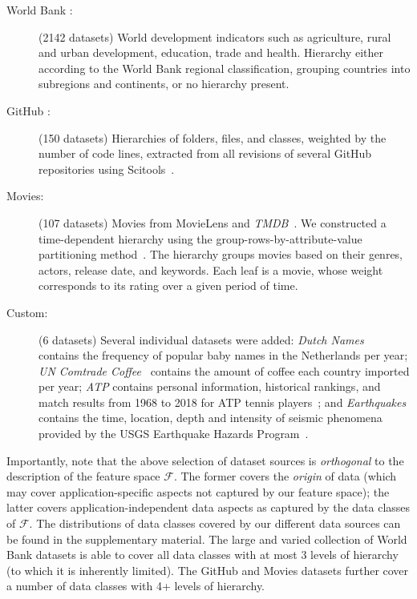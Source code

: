 \begin{description}
\item[World Bank \citep{URLWorldbank}:] (2142 datasets) World development indicators such as agriculture, rural and urban development, education, trade and health. Hierarchy either according to the World Bank regional classification, grouping countries into subregions and continents, or no hierarchy present.
\item[GitHub \citep{URLGit}:] (150 datasets) Hierarchies of folders, files, and classes, weighted by the number of code lines, extracted from all revisions of several GitHub repositories using Scitools~\citep{URLscitools}.
\item[Movies:] (107 datasets) Movies from MovieLens \citep{harper2016movielens} and \emph{TMDB}~\citep{URLmdb}. We constructed a time-dependent hierarchy using the group-rows-by-attribute-value partitioning method~\citep{tablelens,vliegen}. The hierarchy groups movies based on their genres, actors, release date, and keywords. Each leaf is a movie, whose weight corresponds to its rating over a given period of time.
\item[Custom:] (6 datasets) Several individual datasets were added: %
\emph{Dutch Names}~\citep{urlmeertens} contains the frequency of popular baby names in the Netherlands per year; \emph{UN Comtrade Coffee}~\citep{URLComtrade} contains the amount of coffee each country imported per year; \emph{ATP} contains personal information, historical rankings, and match results from 1968 to 2018 for ATP tennis players~\citep{URLatp}; and \emph{Earthquakes} contains the time, location, depth and intensity of seismic phenomena provided by the USGS Earthquake Hazards Program~\citep{URLearth}.
\end{description}
%
Importantly, note that the above selection of dataset sources is \emph{orthogonal} to the description of the feature space $\mathcal{F}$. The former covers the \emph{origin} of data (which may cover application-specific aspects not captured by our feature space); the latter covers application-independent data aspects as captured by the data classes of $\mathcal{F}$. The distributions of data classes covered by our different data sources can be found in the supplementary material. The large and varied collection of World Bank datasets is able to cover all data classes with at most 3 levels of hierarchy (to which it is inherently limited). The GitHub and Movies datasets further cover a number of data classes with 4+ levels of hierarchy. 

